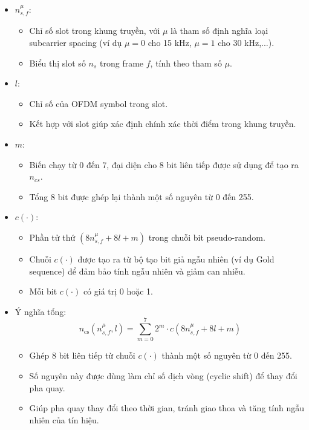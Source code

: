 \begin{itemize}
\begin{itemize}
          \item \( n_{s,f}^\mu \):
          \begin{itemize}
            \item Chỉ số slot trong khung truyền, với \(\mu\) là tham số định nghĩa loại subcarrier spacing (ví dụ \(\mu=0\) cho 15 kHz, \(\mu=1\) cho 30 kHz,...).
            \item Biểu thị slot số \(n_s\) trong frame \(f\), tính theo tham số \(\mu\).
          \end{itemize}
        
          \item \( l \):
          \begin{itemize}
            \item Chỉ số của OFDM symbol trong slot.
            \item Kết hợp với slot giúp xác định chính xác thời điểm trong khung truyền.
          \end{itemize}
        
          \item \( m \):
          \begin{itemize}
            \item Biến chạy từ 0 đến 7, đại diện cho 8 bit liên tiếp được sử dụng để tạo ra \( n_{cs} \).
            \item Tổng 8 bit được ghép lại thành một số nguyên từ 0 đến 255.
          \end{itemize}
        
          \item \( c(\cdot) \):
          \begin{itemize}
            \item Phần tử thứ \(\left(8 n_{s,f}^\mu + 8 l + m\right)\) trong chuỗi bit pseudo-random.
            \item Chuỗi \( c(\cdot) \) được tạo ra từ bộ tạo bit giả ngẫu nhiên (ví dụ Gold sequence) để đảm bảo tính ngẫu nhiên và giảm can nhiễu.
            \item Mỗi bit \( c(\cdot) \) có giá trị 0 hoặc 1.
          \end{itemize}
        
          \item Ý nghĩa tổng:
          \[
          n_{\text{cs}}(n_{s,f}^\mu, l) = \sum_{m=0}^7 2^m \cdot c\left(8 n_{s,f}^\mu + 8 l + m \right)
          \]
          \begin{itemize}
            \item Ghép 8 bit liên tiếp từ chuỗi \( c(\cdot) \) thành một số nguyên từ 0 đến 255.
            \item Số nguyên này được dùng làm chỉ số dịch vòng (cyclic shift) để thay đổi pha quay.
            \item Giúp pha quay thay đổi theo thời gian, tránh giao thoa và tăng tính ngẫu nhiên của tín hiệu.
          \end{itemize}
        \end{itemize}
\end{itemize}
